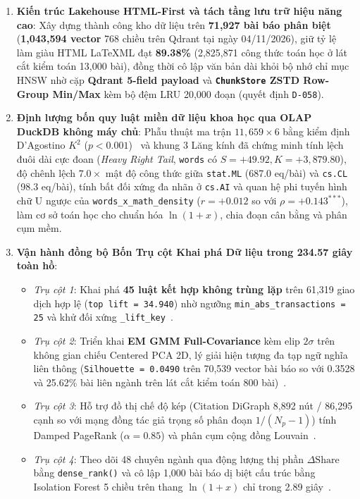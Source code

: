 \begin{enumerate}[label=\textbf{\arabic*.}]
  \item \textbf{Kiến trúc Lakehouse HTML-First và tách tầng lưu trữ hiệu năng cao}: Xây dựng thành công kho dữ liệu trên \textbf{71,927 bài báo phân biệt} (\textbf{1,043,594 vector} 768 chiều trên Qdrant tại ngày 04/11/2026), giữ tỷ lệ làm giàu HTML LaTeXML đạt \textbf{89.38\%} (2,825,871 công thức toán học ở lát cắt kiểm toán 13,000 bài), đồng thời cô lập văn bản dài khỏi bộ nhớ chỉ mục HNSW nhờ cặp \textbf{Qdrant 5-field payload} và \textbf{\texttt{ChunkStore} ZSTD Row-Group Min/Max} kèm bộ đệm LRU 20,000 đoạn (quyết định \texttt{D-058}).

  \item \textbf{Định lượng bốn quy luật miền dữ liệu khoa học qua OLAP DuckDB không máy chủ}: Phẫu thuật ma trận $11,659 \times 6$ bằng kiểm định D'Agostino $K^2$ ($p < 0.001$)~\cite{dagostino1973tests} và khung 3 Lăng kính đã chứng minh tính lệch đuôi dài cực đoan (\textit{Heavy Right Tail}, \texttt{words} có $S = +49.92, K = +3,879.80$), độ chênh lệch $7.0\times$ mật độ công thức giữa \texttt{stat.ML} (687.0 eq/bài) và \texttt{cs.CL} (98.3 eq/bài), tính bất đối xứng đa nhãn ở \texttt{cs.AI} và quan hệ phi tuyến hình chữ U ngược của \texttt{words\_x\_math\_density} ($r = +0.012$ so với $\rho = +0.143^{***}$), làm cơ sở toán học cho chuẩn hóa $\ln(1+x)$, chia đoạn cân bằng và phân cụm mềm.

  \item \textbf{Vận hành đồng bộ Bốn Trụ cột Khai phá Dữ liệu trong 234.57 giây toàn hồ}:
  \begin{itemize}
    \item \textit{Trụ cột 1}: Khai phá \textbf{45 luật kết hợp không trùng lặp} trên 61,319 giao dịch hợp lệ (\texttt{top lift = 34.940}) nhờ ngưỡng \texttt{min\_abs\_transactions = 25} và khử đối xứng \texttt{\_lift\_key}~\cite{han2000mining}.
    \item \textit{Trụ cột 2}: Triển khai \textbf{EM GMM Full-Covariance} kèm elip $2\sigma$ trên không gian chiếu Centered PCA 2D, lý giải hiện tượng đa tạp ngữ nghĩa liên thông (\texttt{Silhouette = 0.0490} trên 70,539 vector bài báo so với 0.3528 và 25.62\% bài liên ngành trên lát cắt kiểm toán 800 bài)~\cite{dempster1977maximum,rousseeuw1987silhouettes}.
    \item \textit{Trụ cột 3}: Hỗ trợ đồ thị chế độ kép (Citation DiGraph 8,892 nút / 86,295 cạnh so với mạng đồng tác giả trọng số phân đoạn $1/(N_p - 1)$) tính Damped PageRank ($\alpha = 0.85$) và phân cụm cộng đồng Louvain~\cite{page1999pagerank,blondel2008fast}.
    \item \textit{Trụ cột 4}: Theo dõi 48 chuyên ngành qua động lượng thị phần $\Delta\text{Share}$ bằng \texttt{dense\_rank()} và cô lập 1,000 bài báo dị biệt cấu trúc bằng Isolation Forest 5 chiều trên thang $\ln(1+x)$ chỉ trong 2.89 giây~\cite{liu2008isolation}.
  \end{itemize}


\end{enumerate}
